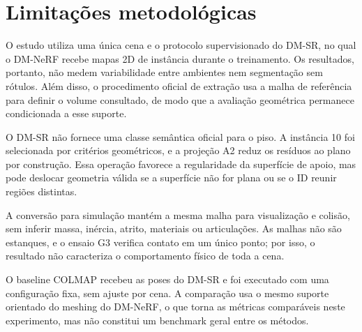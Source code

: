 \chapter{Limitações metodológicas}\label{cap:limitacoes}

O estudo utiliza uma única cena e o protocolo supervisionado do DM-SR, no qual o DM-NeRF recebe mapas 2D de instância durante o treinamento. Os resultados, portanto, não medem variabilidade entre ambientes nem segmentação sem rótulos. Além disso, o procedimento oficial de extração usa a malha de referência para definir o volume consultado, de modo que a avaliação geométrica permanece condicionada a esse suporte.

O DM-SR não fornece uma classe semântica oficial para o piso. A instância 10 foi selecionada por critérios geométricos, e a projeção A2 reduz os resíduos ao plano por construção. Essa operação favorece a regularidade da superfície de apoio, mas pode deslocar geometria válida se a superfície não for plana ou se o ID reunir regiões distintas.

A conversão para simulação mantém a mesma malha para visualização e colisão, sem inferir massa, inércia, atrito, materiais ou articulações. As malhas não são estanques, e o ensaio G3 verifica contato em um único ponto; por isso, o resultado não caracteriza o comportamento físico de toda a cena.

O baseline COLMAP recebeu as poses do DM-SR e foi executado com uma configuração fixa, sem ajuste por cena. A comparação usa o mesmo suporte orientado do meshing do DM-NeRF, o que torna as métricas comparáveis neste experimento, mas não constitui um benchmark geral entre os métodos.
